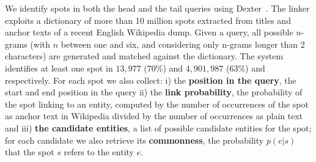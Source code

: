 We identify spots in both the head and the tail queries %
using Dexter~\cite{ceccarelli2013dexter}. The linker exploits a dictionary of 
more than 10 million spots extracted 
from titles and anchor texts of a recent English Wikipedia dump. Given a query, 
all possible $n$-grams (with $n$ between one and six, and considering only n-grams 
longer than 2 characters) are generated and matched against the dictionary. The system identifies 
at least one spot in $13,977$ ($70\%$) and $4,901,987$ ($63\%$) \head{} and \tail{} 
respectively. For each spot we also collect: 
i) the \textbf{position in the query}, the start and end position in the query ii)
 the \textbf{link probability}, the probability
of the spot linking to an entity, computed by the number of occurrences of the spot 
as anchor text in Wikipedia divided by the number of occurrences as plain text and iii)
 \textbf{the candidate entities}, a list of possible candidate entities for the spot; 
 for each candidate we also retrieve its \textbf{commonness}, the probability $p(e|s)$ that
  the spot $s$ refers to the entity $e$.


